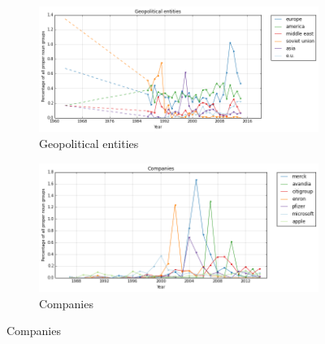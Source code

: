 \begin{figure}
                  \medskip
                  \begin{subfigure}{0.48\textwidth}
                  \includegraphics[width=\linewidth]{../images/geopol}
                  \caption{Geopolitical entities} \label{fig:c}
                  \end{subfigure}\hspace*{\fill}
                  \begin{subfigure}{0.48\textwidth}
                  \includegraphics[width=\linewidth]{../images/companies}
                  \caption{Companies} \label{fig:d}
                  \end{subfigure}


\end{figure}
